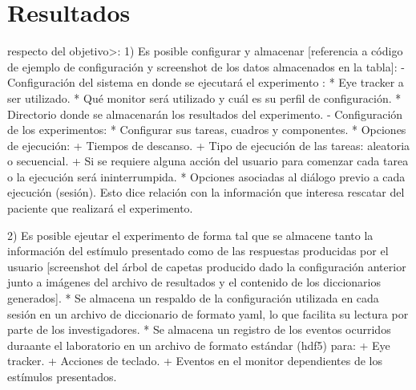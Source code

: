 \documentclass[\main/main.tex]{subfiles}
\begin{document}
\chapter{Resultados}
\label{cha:04_resultados}
	respecto del objetivo>:
		1) Es posible configurar y almacenar [referencia a código de ejemplo de configuración y screenshot de los datos almacenados en la tabla]:
			- Configuración del sistema en donde se ejecutará el experimento :
				* Eye tracker a ser utilizado.
				* Qué monitor será utilizado y cuál es su perfil de configuración.
				* Directorio donde se almacenarán los resultados del experimento.
			- Configuración de los experimentos:
				* Configurar sus tareas, cuadros y componentes.
				* Opciones de ejecución:
					+ Tiempos de descanso.
					+ Tipo de ejecución de las tareas: aleatoria o secuencial.
					+ Si se requiere alguna acción del usuario para comenzar cada tarea o la ejecución será ininterrumpida.
				* Opciones asociadas al diálogo previo a cada ejecución (sesión). Esto dice relación con la información que interesa rescatar del paciente que realizará el experimento.

		2) Es posible ejeutar el experimento de forma tal que se almacene tanto la información del estímulo presentado como de las respuestas producidas por el usuario [screenshot del árbol de capetas producido dado la configuración anterior junto a imágenes del archivo de resultados y el contenido de los diccionarios generados].
			* Se almacena un respaldo de la configuración utilizada en cada sesión en un archivo de diccionario de formato yaml, lo que facilita su lectura por parte de los investigadores.
			* Se almacena un registro de los eventos ocurridos duraante el laboratorio en un archivo de formato estándar (hdf5) para:
				+ Eye tracker.
				+ Acciones de teclado.  
				+ Eventos en el monitor dependientes de los estímulos presentados.

\end{document}
